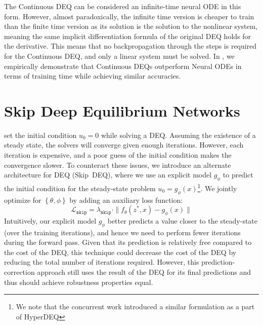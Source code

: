 The Continuous DEQ can be considered an infinite-time neural ODE in this form. However, almost paradoxically, the infinite time version is cheaper to train than the finite time version as its solution is the solution to the nonlinear system, meaning the same implicit differentiation formula of the original DEQ holds for the derivative. This means that no backpropagation through the steps is required for the Continuous DEQ, and only a linear system must be solved. In , we empirically demonstrate that Continuous DEQs outperform Neural ODEs in terms of training time while achieving similar accuracies.


\section{Skip Deep Equilibrium Networks}
\label{sec:skip_deqs}

\citet{bai_deep_2019, bai_multiscale_2020} set the initial condition $u_0 = 0$ while solving a DEQ. Assuming the existence of a steady state, the solvers will converge given enough iterations. However, each iteration is expensive, and a poor guess of the initial condition makes the convergence slower. To counteract these issues, we introduce an alternate architecture for DEQ (Skip~DEQ), where we use an explicit model $g_\phi$ to predict the initial condition for the steady-state problem $u_0 = g_\phi(x)$\footnote{We note that the concurrent work \citet{bai2021neural} introduced a similar formulation as a part of HyperDEQ}. We jointly optimize for $\left\{\theta, \phi\right\}$ by adding an auxiliary loss function:
%
\begin{equation}
    \mathcal{L}_{\texttt{skip}} = \lambda_{\texttt{skip}} \cdot \| f_\theta(z^*, x) - g_\phi(x) \|
\end{equation}
%
Intuitively, our explicit model $g_\phi$ better predicts a value closer to the steady-state (over the training iterations), and hence we need to perform fewer iterations during the forward pass. Given that its prediction is relatively free compared to the cost of the DEQ, this technique could decrease the cost of the DEQ by reducing the total number of iterations required. However, this prediction-correction approach still uses the result of the DEQ for its final predictions and thus should achieve robustness properties equal.

